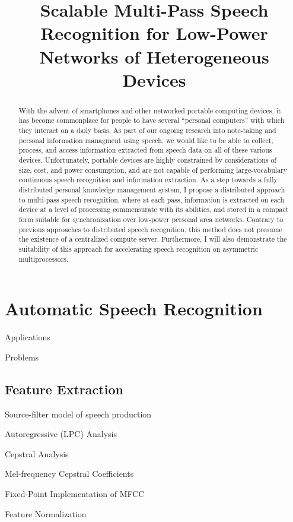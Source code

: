 \documentclass{article}
\title{Scalable Multi-Pass Speech Recognition for Low-Power Networks of Heterogeneous Devices}
\begin{document}
\begin{abstract}

  With the advent of smartphones and other networked portable
  computing devices, it has become commonplace for people to have
  several ``personal computers'' with which they interact on a daily
  basis.  As part of our ongoing research into note-taking and
  personal information managment using speech, we would like to be
  able to collect, process, and access information extracted from
  speech data on all of these various devices.  Unfortunately,
  portable devices are highly constrained by considerations of size,
  cost, and power consumption, and are not capable of performing
  large-vocabulary continuous speech recognition and information
  extraction.  As a step towards a fully distributed personal
  knowledge management system, I propose a distributed approach to
  multi-pass speech recognition, where at each pass, information is
  extracted on each device at a level of processing commensurate with
  its abilities, and stored in a compact form suitable for
  synchronization over low-power personal area networks.  Contrary to
  previous approaches to distributed speech recognition, this method
  does not presume the existence of a centralized compute server.
  Furthermore, I will also demonstrate the suitability of this
  approach for accelerating speech recognition on asymmetric
  multiprocessors.
  
\end{abstract}

\section{Automatic Speech Recognition}
\label{sec:asr}

Applications

Problems

\subsection{Feature Extraction}
\label{sec:fe}

Source-filter model of speech production

Autoregressive (LPC) Analysis

Cepstral Analysis

Mel-frequency Cepstral Coefficients

Fixed-Point Implementation of MFCC

Feature Normalization
\end{document}
